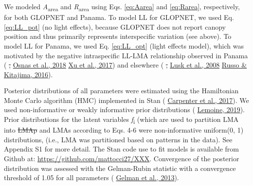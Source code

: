 \documentclass[
  12pt,
  a4paper,
,tablecaptionabove
]{scrartcl}
\providecommand{\DIFaddtex}[1]{{\protect\color{blue}\uwave{#1}}} %
\providecommand{\DIFdeltex}[1]{{\protect\color{red}\sout{#1}}}                      %
\providecommand{\DIFaddbegin}{} %
\providecommand{\DIFaddend}{} %
\providecommand{\DIFdelbegin}{} %
\providecommand{\DIFdelend}{} %
\providecommand{\DIFadd}[1]{\texorpdfstring{\DIFaddtex{#1}}{#1}} %
\providecommand{\DIFdel}[1]{\texorpdfstring{\DIFdeltex{#1}}{}} %
\newcommand{\DIFscaledelfig}{0.5}
\newlength{\DIFdelgraphicswidth} %
\newlength{\DIFdelgraphicsheight} %
\newcommand{\DIFaddincludegraphics}[2][]{{\color{blue}\fbox{\DIFOincludegraphics[#1]{#2}}}} %
\newcommand{\DIFdelincludegraphics}[2][]{%
\sbox{\DIFdelgraphicsbox}{\DIFOincludegraphics[#1]{#2}}%
\settoboxwidth{\DIFdelgraphicswidth}{\DIFdelgraphicsbox} %
\settoboxtotalheight{\DIFdelgraphicsheight}{\DIFdelgraphicsbox} %
\scalebox{\DIFscaledelfig}{%
\parbox[b]{\DIFdelgraphicswidth}{\usebox{\DIFdelgraphicsbox}\\[-\baselineskip] \rule{\DIFdelgraphicswidth}{0em}}\llap{\resizebox{\DIFdelgraphicswidth}{\DIFdelgraphicsheight}{%
\setlength{\unitlength}{\DIFdelgraphicswidth}%
\begin{picture}(1,1)%
\thicklines\linethickness{2pt} %
{\color[rgb]{1,0,0}\put(0,0){\framebox(1,1){}}}%
{\color[rgb]{1,0,0}\put(0,0){\line( 1,1){1}}}%
{\color[rgb]{1,0,0}\put(0,1){\line(1,-1){1}}}%
\end{picture}%
}\hspace*{3pt}}} %
} %
\DeclareRobustCommand{\DIFaddbegin}{\DIFOaddbegin \let\includegraphics\DIFaddincludegraphics} %
\DeclareRobustCommand{\DIFaddend}{\DIFOaddend \let\includegraphics\DIFOincludegraphics} %
\DeclareRobustCommand{\DIFdelbegin}{\DIFOdelbegin \let\includegraphics\DIFdelincludegraphics} %
\DeclareRobustCommand{\DIFdelend}{\DIFOaddend \let\includegraphics\DIFOincludegraphics} %
\begin{document}
We modeled \emph{A}\textsubscript{area} and \emph{R}\textsubscript{area}
using Eqs. \ref{eq:Aarea} and \ref{eq:Rarea}, respectively, for both
GLOPNET and Panama. To model LL for GLOPNET, we used Eq. \ref{eq:LL_pot}
(no light effects), because GLOPNET does not report canopy position and
thus primarily represents interspecific variation (see above). To model
LL for Panama, we used Eq. \ref{eq:LL_opt} (light effects model), which
was motivated by the negative intraspecific LL-LMA relationship observed
in Panama (\protect\DIFdelbegin %
\DIFdel{,
}\DIFdelend \DIFaddbegin \hyperlink{ref-Osnas2018}{Osnas et al., 2018}\DIFadd{;
}\DIFaddend \protect\DIFdelbegin %
\DIFdelend \DIFaddbegin \hyperlink{ref-Xu2017}{Xu et al., 2017}\DIFaddend ) and elsewhere
(\protect\DIFdelbegin %
\DIFdel{,
}\DIFdelend \DIFaddbegin \hyperlink{ref-Lusk2008}{Lusk et al., 2008}\DIFadd{;
}\DIFaddend \protect\DIFdelbegin %
\DIFdelend \DIFaddbegin \hyperlink{ref-Russo2016}{Russo \& Kitajima, 2016}\DIFaddend ).

Posterior distributions of all parameters were estimated using the
Hamiltonian Monte Carlo algorithm (HMC) implemented in Stan
(\protect\DIFdelbegin %
\DIFdelend \DIFaddbegin \hyperlink{ref-Carpenter2017}{Carpenter et al., 2017}\DIFaddend ). We used
non-informative or weakly informative prior distributions
(\protect\DIFdelbegin %
\DIFdelend \DIFaddbegin \hyperlink{ref-Lemoine2019}{Lemoine, 2019}\DIFaddend ). Prior
distributions for the latent variables \emph{f}\textsubscript{i} (which
are used to partition LMA into \DIFdelbegin \DIFdel{LMAp }\DIFdelend \DIFaddbegin \DIFadd{LMAm }\DIFaddend and LMAs according to Eqs. 4-6 were
non-informative uniform(0, 1) distributions, (i.e., LMA was partitioned
based on patterns in the data). See Appendix S1 for more detail. The
Stan code use to fit models is available from Github at:
\href{https://github.com/mattocci27/xxx}{https://github.com/mattocci27/XXX}.
Convergence of the posterior distribution was assessed with the
Gelman-Rubin statistic with a convergence threshold of 1.05 for all
parameters (\protect\DIFdelbegin %
\DIFdelend \DIFaddbegin \hyperlink{ref-Gelman2013}{Gelman et al., 2013}\DIFaddend ).
\end{document}
